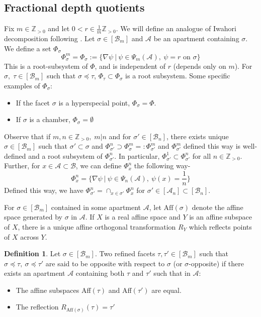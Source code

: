 \documentclass[11 pt]{article}
\numberwithin{equation}{subsection}
\theoremstyle{definition}
\newtheorem{definition}[theorem]{Definition}
\theoremstyle{remark}
\theoremstyle{conjecture}
\newcommand{\Z}{\mathbb Z}
\newcommand{\A}{\mathcal A}
\newcommand{\B}{\mathcal{B}}
\begin{document}
\subsection{Fractional depth quotients}
Fix $m\in \Z_{>0}$ and let $0<r \in \frac{1}{m}\Z_{>0}$. We will define an analogue of Iwahori decomposition following \cite{moysavin}. Let $\sigma \in [\B_m]$ and $\A$ be an apartment containing $\sigma$. We define a set $\Phi_\sigma$
\begin{equation}\label{defnphi_sigma}
    \Phi^m_\sigma=\Phi_\sigma:=\{\nabla\psi\:|\: \psi \in \Psi_m(\A),\: \psi=r \text{ on }\sigma\}
\end{equation}
This is a root-subsystem of $\Phi$, and is independent of $r$ (depends only on $m$). For $\sigma, \; \tau \in [\B_m]$ such that $\sigma \preceq \tau$, $\Phi_\tau\subset \Phi_\sigma$ is a root subsystem. 
Some specific examples of $\Phi_\sigma$:
\begin{itemize}
    \item If the facet $\sigma$ is a hyperspecial point, $\Phi_\sigma=\Phi$.
    \item If $\sigma$ is a chamber, $\Phi_\sigma=\emptyset$
\end{itemize}
Observe that if $m,n \in \Z_{>0}, \; m|n$ and for $\sigma' \in [\B_n]$, there exists unique $\sigma \in [\B_m]$ such that $\sigma' \subset \sigma$ and $\Phi_{\sigma'}^n\supset \Phi_\sigma^m=:\Phi_{\sigma'}^m$ and $\Phi_{\sigma'}^m $ defined this way is well-defined and a root subsystem of $\Phi_{\sigma'}^n$. In particular, $\Phi^1_{\sigma'} \subset \Phi^n_{\sigma'}$ for all $n \in \Z_{>0}$. Further, for $x \in \A\subset \B$, we can define $\Phi^n_x$ the following way-
\begin{equation}
    \Phi_x^n= \{\nabla\psi\:|\: \psi \in \Psi_n(\A),\: \psi(x)=\frac{1}{n}\}
\end{equation}
Defined this way, we have $\Phi_{\sigma'}^n=\cap_{x \in \sigma'}\Phi_x^n$ for $\sigma'\in [\A_n] \subset [\B_n]$. \par
For $\sigma \in [\B_m]$ contained in some apartment $\A$, let $\text{Aff}(\sigma)$ denote the affine space generated by $\sigma$ in $\A$. If $X$ is a real affine space and $Y$ is an affine subspace of $X$, there is a unique affine orthogonal transformation $R_Y$ which reflects points of $X$ across $Y$. 
\begin{definition}
    Let $\sigma \in [\B_m]$. Two refined facets $\tau, \tau' \in [\B_m]$ such that $\sigma \preceq\tau,\: \sigma\preceq \tau'$ are said to be opposite with respect to $\sigma$ (or $\sigma$-opposite) if there exists an apartment $\A$ containing both $\tau $ and $\tau'$ such that in $\A$:
    \begin{itemize}
        \item [(i)] The affine subspaces Aff$(\tau)$ and Aff$(\tau')$ are equal. 
        \item[(ii)] The reflection $R_{\text{Aff}(\sigma)}(\tau)=\tau'$ 
    \end{itemize}
\end{definition}
\end{document}
